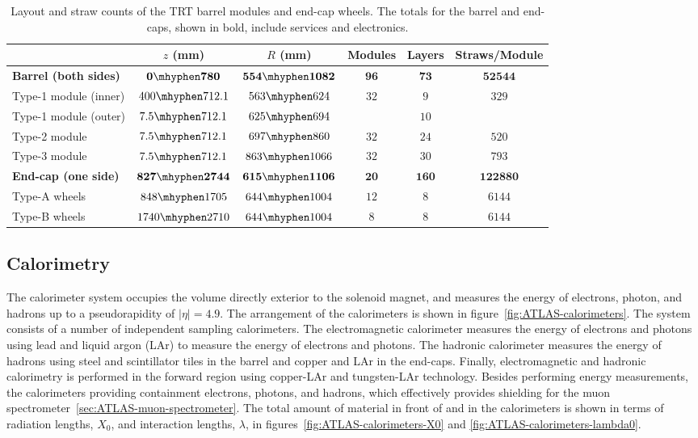 \begin{table}[htbp]
	\centering
	\begin{tabular}{|l|c|c|c|c|c|}
		\hline
		 & $z$ (mm) & $R$ (mm) & Modules & Layers & Straws/Module \\
		 \hline
		 \textbf{Barrel (both sides)} & $\mathbf{0\mhyphen780}$ & $\mathbf{554\mhyphen1082}$ & $\mathbf{96}$ & $\mathbf{73}$ & $\mathbf{52544}$ \\
		 Type-1 module (inner) & $400\mhyphen712.1$ & $563\mhyphen624$ & \multirow{2}{*}{$32$} & $9$ & \multirow{2}{*}{$329$} \\
		 Type-1 module (outer) & $7.5\mhyphen712.1$ & $625\mhyphen 694$ & & $10$ & \\
		 Type-2 module & $7.5\mhyphen 712.1$ & $697\mhyphen860$ & $32$ & $24$ & $520$ \\
		 Type-3 module & $7.5\mhyphen 712.1$ & $863\mhyphen 1066$ & $32$ & $30$ & $793$ \\
		 \hline
		 \textbf{End-cap (one side)} & $\mathbf{827\mhyphen 2744}$ & $\mathbf{615\mhyphen1106}$ & $\mathbf{20}$ & $\mathbf{160}$ & $\mathbf{122880}$ \\
		 Type-A wheels & $848\mhyphen1705$ & $644\mhyphen1004$ & $12$ & $8$ & $6144$ \\
		 Type-B wheels & $1740\mhyphen2710$ & $644\mhyphen1004$ & $8$ & $8$ & $6144$ \\
		 \hline
	\end{tabular}
	\caption{Layout and straw counts of the TRT barrel modules and end-cap wheels. The totals for the barrel and end-caps, shown in bold, include services and electronics.}	
	\label{table:ATLAS-TRT-layout}
\end{table}


\subsection{Calorimetry}\label{sec:ATLAS-calorimeters}
The calorimeter system occupies the volume directly exterior to the solenoid magnet, and measures the energy of electrons, photon, and hadrons up to a pseudorapidity of $|\eta|=4.9$. The arrangement of the calorimeters is shown in figure~\ref{fig:ATLAS-calorimeters}. The system consists of a number of independent sampling calorimeters. The electromagnetic calorimeter measures the energy of electrons and photons using lead and liquid argon (LAr) to measure the energy of electrons and photons. The hadronic calorimeter measures the energy of hadrons using steel and scintillator tiles in the barrel and copper and LAr in the end-caps. Finally, electromagnetic and hadronic calorimetry is performed in the forward region using copper-LAr and tungsten-LAr technology. Besides performing energy measurements, the calorimeters providing containment electrons, photons, and hadrons, which effectively provides shielding for the muon spectrometer~\ref{sec:ATLAS-muon-spectrometer}. The total amount of material in front of and in the calorimeters is shown in terms of radiation lengths, $X_0$, and interaction lengths, $\lambda$, in figures~\ref{fig:ATLAS-calorimeters-X0} and \ref{fig:ATLAS-calorimeters-lambda0}.


